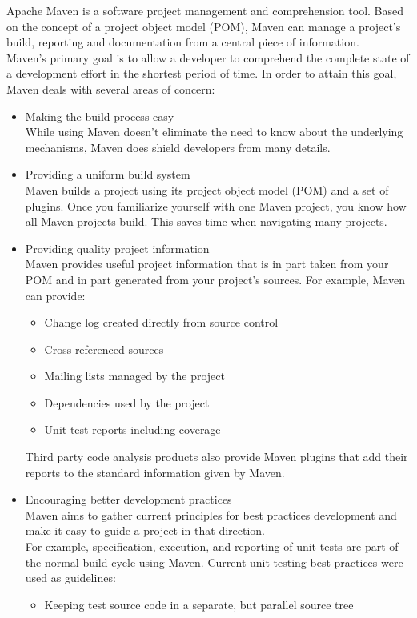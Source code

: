 Apache Maven is a software project management and comprehension tool.
Based on the concept of a project object model (POM), Maven can manage a
project's build, reporting and documentation from a central piece of
information.\\
Maven’s primary goal is to allow a developer to comprehend the
complete state of a development effort in the shortest period of
time. In order to attain this goal, Maven deals with several areas
of concern:
\begin{itemize}
\item Making the build process easy\\
While using Maven doesn’t eliminate the need to know about the underlying mechanisms, Maven does shield developers from many details.
\item Providing a uniform build system\\
Maven builds a project using its project object model (POM) and a set of plugins. Once you familiarize yourself with one Maven project, you know how all Maven projects build. This saves time when navigating many projects.
\item Providing quality project information\\
Maven provides useful project information that is in part taken from your POM and in part generated from your project’s sources. For example, Maven can provide:
\begin{itemize}
\item Change log created directly from source control
\item Cross referenced sources
\item Mailing lists managed by the project
\item Dependencies used by the project
\item Unit test reports including coverage
\end{itemize}
Third party code analysis products also provide Maven plugins that add their reports to the standard information given by Maven.
\item Encouraging better development practices\\
Maven aims to gather current principles for best practices development and make it easy to guide a project in that direction.\\
For example, specification, execution, and reporting of unit tests are part of the normal build cycle using Maven. Current unit testing best practices were used as guidelines:
\begin{itemize}
\item Keeping test source code in a separate, but parallel source tree

\end{itemize}
\end{itemize}
